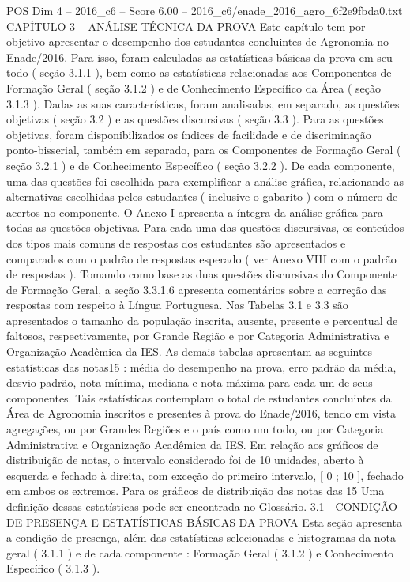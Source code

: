 \begin{textsample}{POS Dim 4 – 2016\_c6 – Score 6.00 – 2016\_c6/enade\_2016\_agro\_6f2e9fbda0.txt}  \label{ex:f4_pos_052}
CAPÍTULO 3 – ANÁLISE TÉCNICA DA PROVA Este capítulo tem por objetivo apresentar o desempenho dos estudantes concluintes de Agronomia no Enade/2016.
Para isso, foram calculadas as estatísticas básicas da prova em seu todo ( seção 3.1.1 ), bem como as estatísticas relacionadas aos Componentes de Formação Geral ( seção 3.1.2 ) e de Conhecimento Específico da Área ( seção 3.1.3 ).
Dadas as suas características, foram analisadas, em separado, as questões objetivas ( seção 3.2 ) e as questões discursivas ( seção 3.3 ).
Para as questões objetivas, foram disponibilizados os índices de facilidade e de discriminação ponto-bisserial, também em separado, para os Componentes de Formação Geral ( seção 3.2.1 ) e de Conhecimento Específico ( seção 3.2.2 ).
De cada componente, uma das questões foi escolhida para exemplificar a análise gráfica, relacionando as alternativas escolhidas pelos estudantes ( inclusive o gabarito ) com o número de acertos no componente.
O Anexo I apresenta a íntegra da análise gráfica para todas as questões objetivas.
Para cada uma das questões discursivas, os conteúdos dos tipos mais comuns de respostas dos estudantes são apresentados e comparados com o padrão de respostas esperado ( ver Anexo VIII com o padrão de respostas ).
Tomando como base as duas questões discursivas do Componente de Formação Geral, a seção 3.3.1.6 apresenta comentários sobre a correção das respostas com respeito à Língua Portuguesa.
Nas Tabelas 3.1 e 3.3 são apresentados o tamanho da população inscrita, ausente, presente e percentual de faltosos, respectivamente, por Grande Região e por Categoria Administrativa e Organização Acadêmica da IES.
As demais tabelas apresentam as seguintes estatísticas das notas15 : média do desempenho na prova, erro padrão da média, desvio padrão, nota mínima, mediana e nota máxima para cada um de seus componentes.
Tais estatísticas contemplam o total de estudantes concluintes da Área de Agronomia inscritos e presentes à prova do Enade/2016, tendo em vista agregações, ou por Grandes Regiões e o país como um todo, ou por Categoria Administrativa e Organização Acadêmica da IES.
Em relação aos gráficos de distribuição de notas, o intervalo considerado foi de 10 unidades, aberto à esquerda e fechado à direita, com exceção do primeiro intervalo, [ 0 ; 10 ], fechado em ambos os extremos.
Para os gráficos de distribuição das notas das 15 Uma definição dessas estatísticas pode ser encontrada no Glossário. 3.1 - CONDIÇÃO DE PRESENÇA E ESTATÍSTICAS BÁSICAS DA PROVA Esta seção apresenta a condição de presença, além das estatísticas selecionadas e histogramas da nota geral ( 3.1.1 ) e de cada componente : Formação Geral ( 3.1.2 ) e Conhecimento Específico ( 3.1.3 ).

\end{textsample}

